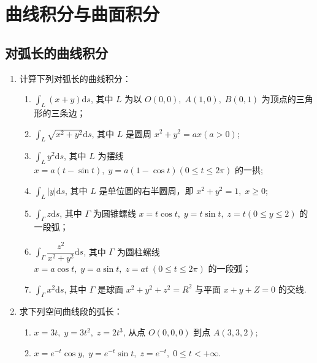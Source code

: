 \chapter{曲线积分与曲面积分}\label{cha:10}



\section{对弧长的曲线积分}

\begin{enumerate}\setlength{\itemsep}{7pt}
    \item 计算下列对弧长的曲线积分：
    \begin{enumerate}[(1)]\setlength{\itemsep}{5pt}\setlength{\topsep}{15pt}
        \item $\displaystyle\int_{L}(x+y)\text{d}s$, 其中 $L$ 为以 $O(0, 0),\;A(1, 0),\;B(0, 1)$ 为顶点的三角形的三条边；
        \item $\displaystyle\int_{L}\sqrt{x^2+y^2}\text{d}s$, 其中 $L$ 是圆周 $x^2+y^2=ax(a>0)$;
        \item $\displaystyle\int_{L}y^2\text{d}s$, 其中 $L$ 为摆线 $x=a(t-\sin t),\;y=a(1-\cos t)(0\leqslant t\leqslant 2\pi)$ 的一拱;
        \item $\displaystyle\int_{L}|y|\text{d}s$, 其中 $L$ 是单位圆的右半圆周，即 $x^2+y^2=1,\;x\geqslant 0$;
        \item $\displaystyle\int_{\Gamma}z\text{d}s$, 其中 $\Gamma$ 为圆锥螺线 $x=t\cos t,\;y=t\sin t,\;z=t(0\leqslant y\leqslant 2)$ 的一段弧；
        \item $\displaystyle\int_{\Gamma}\dfrac{z^2}{x^2+y^2}\text{d}s$, 其中 $\Gamma$ 为圆柱螺线 $x=a\cos t,\;y=a\sin t,\;z=at\;(0\leqslant t\leqslant 2\pi)$ 的一段弧；
        \item $\displaystyle\int_{\Gamma}x^2\text{d}s$, 其中 $\Gamma$ 是球面 $x^2+y^2+z^2=R^2$ 与平面 $x+y+Z=0$ 的交线.
    \end{enumerate}

    \item 求下列空间曲线段的弧长：
    \begin{enumerate}[(1)]\setlength{\itemsep}{5pt}\setlength{\topsep}{15pt}
        \item $x=3t,\;y=3t^2,\;z=2t^3$, 从点 $O(0, 0, 0)$ 到点 $A(3, 3, 2)$;
        \item $x=e^{-t}\cos y,\;y=e^{-t}\sin t,\;z=e^{-t},\;0\leqslant t<+\infty$.
    \end{enumerate}
\end{enumerate}


